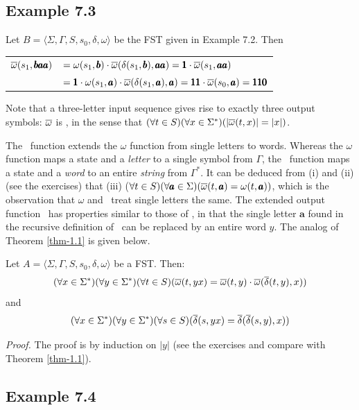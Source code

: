 \subsection*{Example 7.3}

Let $B=\langle\Sigma,\Gamma,S,s_0,\delta,\omega\rangle$ be the FST given in
Example 7.2. Then
\begin{center}
\begin{tabular}{rl}
$\overline{\omega}(s_1,\pmb{baa})$ & $=\omega(s_1,\pmb{b}) \cdot \overline{\omega}(\delta(s_1,\pmb{b}),
	\pmb{aa}) = \pmb{1} \cdot \overline{\omega}(s_1,\pmb{aa})$ \\
& $= \pmb{1} \cdot \omega(s_1,\pmb{a})\cdot\overline{\omega}(\delta(s_1,\pmb{a}),\pmb{a}) =
	\pmb{11}\cdot \overline{\omega}(s_0,\pmb{a}) = \pmb{110}$
\end{tabular}
\end{center}
Note that a three-letter input sequence gives rise to exactly three output
symbols: $\overline{\omega}$ is \emph{}, in the sense that
$(\forall t \in S)(\forall x \in \Sigma^*)(|\overline{\omega}(t,x)| = |x|)$.

The \OBAR\ function extends the $\omega$ function from single letters to words.
Whereas the $\omega$ function maps a state and a \emph{letter} to a single
symbol from $\Gamma$, the \OBAR\ function maps a state and a \emph{word} to an
entire \emph{string} from $\Gamma^*$. It can be deduced from (i) and (ii) (see
the exercises) that (iii) ($\forall t \in S)(\forall \pmb{a} \in \Sigma)(\overline{\omega}(t, \pmb{a})
= \omega(t,\pmb{a}))$, which is the observation that $\omega$ and \OBAR\ treat single
letters the same. The extended output function \OBAR\ has properties similar to
those of \DBAR, in that the single letter $\pmb{a}$ found in the recursive
definition of \OBAR\ can be replaced by an entire word $y$. The analog of
Theorem \ref{thm-1.1} is given below.

\begin{thm}\label{thm-7.1}
Let $A=\langle\Sigma,\Gamma,S,s_0,\delta,\omega\rangle$ be a FST. Then:
\[ (\forall x \in \Sigma^*)(\forall y \in \Sigma^*)(\forall t \in S)(\overline{\omega}(t,yx)
	= \overline{\omega}(t,y) \cdot \overline{\omega}(\overline{\delta}(t,y),x)) \]
and
\[ (\forall x \in \Sigma^*)(\forall y \in \Sigma^*)(\forall s \in S)(\overline{\delta}(s,yx)
	= \overline{\delta}(\overline{\delta}(s,y),x)) \]

\emph{Proof.} The proof is by induction on $|y|$ (see the exercises and compare
with Theorem \ref{thm-1.1}).
\end{thm}

\subsection*{Example 7.4}

